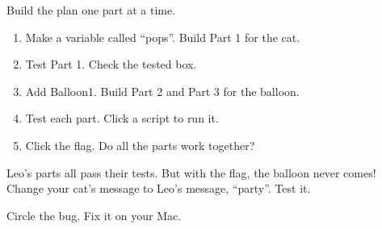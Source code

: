 \begin{exercise}
Build the plan one part at a time.
\begin{enumerate}[leftmargin=1.4em,itemsep=2pt]
  \item Make a variable called \enquote{pops}. Build Part 1 for the cat.
  \item Test Part 1. Check the tested box.
  \item Add Balloon1. Build Part 2 and Part 3 for the balloon.
  \item Test each part. Click a script to run it.
  \item Click the flag. Do all the parts work together?
\end{enumerate}
\begin{center}
\begin{scratch}[scale=0.75]
\end{scratch}
\qquad
\begin{scratch}[scale=0.75]
\end{scratch}

\begin{scratch}[scale=0.75]
\end{scratch}
\qquad
\begin{scratch}[scale=0.75]
\end{scratch}
\end{center}
\end{exercise}

\begin{exercise}
Leo's parts all pass their tests. But with the flag, the balloon never comes! Change your cat's message to Leo's message, \enquote{party}. Test it.
\begin{center}
\begin{scratch}[scale=0.75]
\end{scratch}
\end{center}
Circle the bug. Fix it on your Mac.
\end{exercise}

